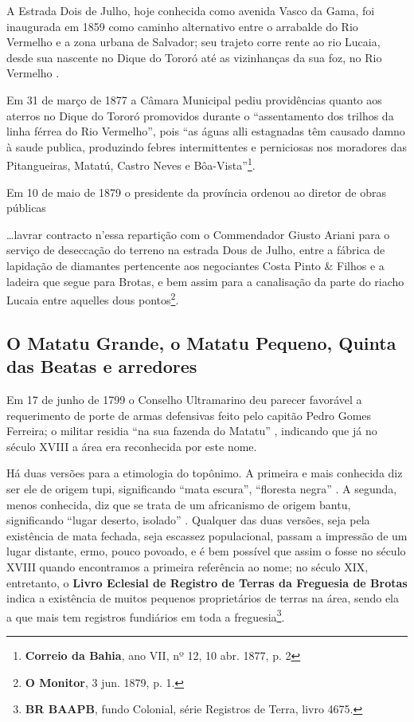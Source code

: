 \begin{citacao}
A Estrada Dois de Julho, hoje conhecida como avenida Vasco da Gama, foi inaugurada em 1859 como caminho alternativo entre o arrabalde do Rio Vermelho e a zona urbana de Salvador; seu trajeto corre rente ao rio Lucaia, desde sua nascente no Dique do Tororó até as vizinhanças da sua foz, no Rio Vermelho \cite[p.~582]{ruy_politica_1949}.

Em 31 de março de 1877 a Câmara Municipal pediu providências quanto aos aterros no Dique do Tororó promovidos durante o ``assentamento dos trilhos da linha férrea do Rio Vermelho'', pois ``as águas alli estagnadas têm causado damno à saude publica, produzindo febres intermittentes e perniciosas nos moradores das Pitangueiras, Matatú, Castro Neves e Bôa-Vista''\footnote{\textbf{Correio da Bahia}, ano VII, nº 12, 10 abr. 1877, p. 2}.

Em 10 de maio de 1879 o presidente da província ordenou ao diretor de obras públicas 

\begin{citacao}
\dots lavrar contracto n'essa repartição com o Commendador Giusto Ariani para o serviço de deseccação do terreno na estrada Dous de Julho, entre a fábrica de lapidação de diamantes pertencente aos negociantes Costa Pinto \& Filhos e a ladeira que segue para Brotas, e bem assim para a canalisação da parte do riacho Lucaia entre aquelles dous pontos\footnote{\textbf{O Monitor}, 3 jun. 1879, p. 1.}.
\end{citacao}



\subsection{O Matatu Grande, o Matatu Pequeno, Quinta das Beatas e arredores}\label{subsec:matatubeatas}

Em 17 de junho de 1799 o Conselho Ultramarino deu parecer favorável a requerimento de porte de armas defensivas feito pelo capitão Pedro Gomes Ferreira; o militar residia ``na sua fazenda do Matatu'' \cite[p.~228]{castralmeida_ultramar_1914}, indicando que já no século XVIII a área era reconhecida por este nome. 

Há duas versões para a etimologia do topônimo. A primeira e mais conhecida diz ser ele de origem tupi, significando ``mata escura'', ``floresta negra'' \cite[p.~281]{sampaio_tupi_1987}. A segunda, menos conhecida, diz que se trata de um africanismo de origem bantu, significando ``lugar deserto, isolado'' \cite[p. 46]{dorea_ruas_2006}. Qualquer das duas versões, seja pela existência de mata fechada, seja escassez populacional, passam a impressão de um lugar distante, ermo, pouco povoado, e é bem possível que assim o fosse no século XVIII quando encontramos a primeira referência ao nome; no século XIX, entretanto, o \textbf{Livro Eclesial de Registro de Terras da Freguesia de Brotas} indica a existência de muitos pequenos proprietários de terras na área, sendo ela a que mais tem registros fundiários em toda a freguesia\footnote{\textbf{BR BAAPB}, fundo Colonial, série Registros de Terra, livro 4675.}.


\end{citacao}

